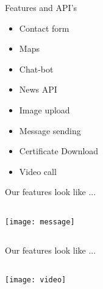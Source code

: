 \documentclass{beamer}
\begin{document}
\begin{frame}{Features and API's}
	
	\begin{center}
	

\begin{itemize}
\item Contact form
\item Maps
\item Chat-bot
\item News API 
\item Image upload
\end{itemize}

\columnbreak


\begin{itemize}
\item Message sending
\item Certificate Download
\item Video call
\end{itemize}
\end{center}
\end{frame}



\begin{frame}{Our features look like ...}
	\begin{columns}
		\begin{column}{5cm}
			\begin{center}
				\texttt{[image: message]}
				
				{\tiny \textcolor{digiPH_darkorange}{ }}
			\end{center}
		\end{column}
		\begin{column}{5cm}
			\begin{center}
				\Large
			
			\end{center}
			
		\end{column}
	\end{columns}
\end{frame}



\begin{frame}{Our features look like ...}
	\begin{columns}
		\begin{column}{5cm}
			\begin{center}
				\texttt{[image: video]}
				
				{\tiny \textcolor{digiPH_darkorange}{ }}
			\end{center}
		\end{column}
		\begin{column}{5cm}
			\begin{center}
				\Large
			
			\end{center}
			
		\end{column}
	\end{columns}
\end{frame}
\end{document}
